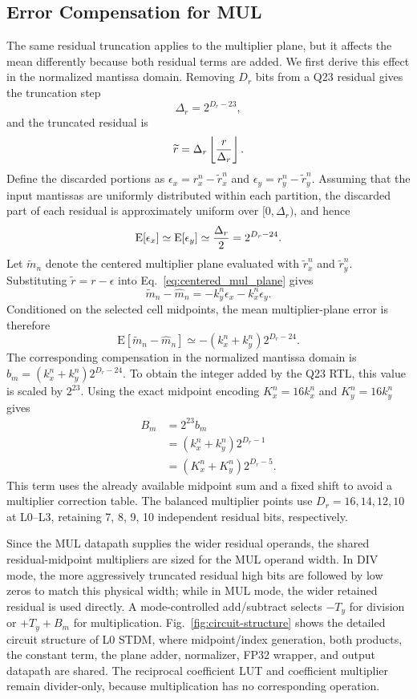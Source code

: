 \documentclass[conference]{IEEEtran}
\begin{document}
\subsection{Error Compensation for MUL}
The same residual truncation applies to the multiplier plane, but it affects
the mean differently because both residual terms are added. We first derive
this effect in the normalized mantissa domain. Removing $D_r$ bits from a Q23
residual gives the truncation step
\[
 \Delta_r=2^{D_r-23},
\]
and the truncated residual is
\[
 \widetilde r=\Delta_r\left\lfloor{r\over\Delta_r}\right\rfloor.
\]
Define the discarded portions as
$\epsilon_x=r_x^n-\widetilde r_x^n$ and
$\epsilon_y=r_y^n-\widetilde r_y^n$. Assuming that the input mantissas are uniformly distributed within each partition, the discarded part of each residual is approximately uniform over $[0,\Delta_r)$, and hence
\[
 \mathrm{E}[\epsilon_x]\simeq\mathrm{E}[\epsilon_y]
 \simeq{\Delta_r\over2}=2^{D_r-24}.
\]
Let $\widetilde m_n$ denote the centered multiplier plane evaluated with
$\widetilde r_x^n$ and $\widetilde r_y^n$. Substituting
$\widetilde r=r-\epsilon$ into Eq.~\eqref{eq:centered_mul_plane} gives
\[
 \widetilde m_n-\widehat m_n
 =-k_y^n\epsilon_x-k_x^n\epsilon_y.
\]
Conditioned on the selected cell midpoints, the mean multiplier-plane error is
therefore
\[
 \mathrm{E}[\widetilde m_n-\widehat m_n]
 \simeq-(k_x^n+k_y^n)2^{D_r-24}.
\]
The corresponding compensation in the normalized mantissa domain is
$b_m=(k_x^n+k_y^n)2^{D_r-24}$. To obtain the integer added by the Q23 RTL, this
value is scaled by $2^{23}$. Using the exact midpoint encoding
$K_x^n=16k_x^n$ and $K_y^n=16k_y^n$ gives
\begin{equation}
 \begin{aligned}
 B_m
 &=2^{23}b_m\\
 &=(k_x^n+k_y^n)2^{D_r-1}\\
 &=(K_x^n+K_y^n)2^{D_r-5}.
 \end{aligned}
 \label{eq:mul_truncation_bias}
\end{equation}
This term uses the already available midpoint sum and a fixed shift to avoid
a multiplier correction table. The balanced multiplier points use
$D_r=16,14,12,10$ at L0--L3, retaining 7, 8, 9, 10 independent
residual bits, respectively.

Since the MUL datapath supplies the wider residual operands, the shared residual-midpoint multipliers are sized for the MUL operand width.
In DIV mode,
the more aggressively truncated residual high bits are followed by low zeros to
match this physical width; while in MUL mode, the wider retained residual is used
directly. A mode-controlled add/subtract selects $-T_y$ for division or
$+T_y+B_m$ for multiplication. Fig.~\ref{fig:circuit-structure} shows the detailed circuit structure of L0 STDM, where midpoint/index generation, both products, the
constant term, the plane adder, normalizer, FP32 wrapper, and output datapath
are shared. The reciprocal coefficient LUT and coefficient multiplier remain
divider-only, because multiplication has no corresponding operation.
\end{document}
